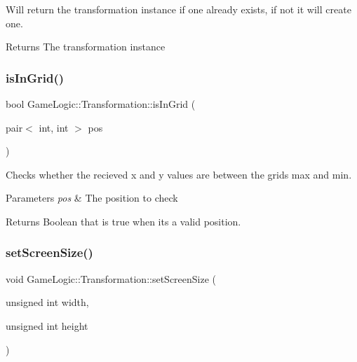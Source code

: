 Will return the transformation instance if one already exists, if not it will create one. \begin{DoxyReturn}{Returns}
The transformation instance 
\end{DoxyReturn}
\mbox{\label{classGameLogic_1_1Transformation_a573549aa64a0932387e9ab116e408493}} 
\subsubsection{\texorpdfstring{is\+In\+Grid()}{isInGrid()}}
{\footnotesize\ttfamily bool Game\+Logic\+::\+Transformation\+::is\+In\+Grid (\begin{DoxyParamCaption}\item[{pair$<$ int, int $>$}]{pos }\end{DoxyParamCaption})}

Checks whether the recieved x and y values are between the grid\textquotesingle{}s max and min. 
\begin{DoxyParams}{Parameters}
{\em pos} & The position to check \\
\hline
\end{DoxyParams}
\begin{DoxyReturn}{Returns}
Boolean that is true when it\textquotesingle{}s a valid position. 
\end{DoxyReturn}
\mbox{\label{classGameLogic_1_1Transformation_a1a65e0d2527c3c558f5dfe59e0832d52}} 
\subsubsection{\texorpdfstring{set\+Screen\+Size()}{setScreenSize()}}
{\footnotesize\ttfamily void Game\+Logic\+::\+Transformation\+::set\+Screen\+Size (\begin{DoxyParamCaption}\item[{unsigned int}]{width,  }\item[{unsigned int}]{height }\end{DoxyParamCaption})}

